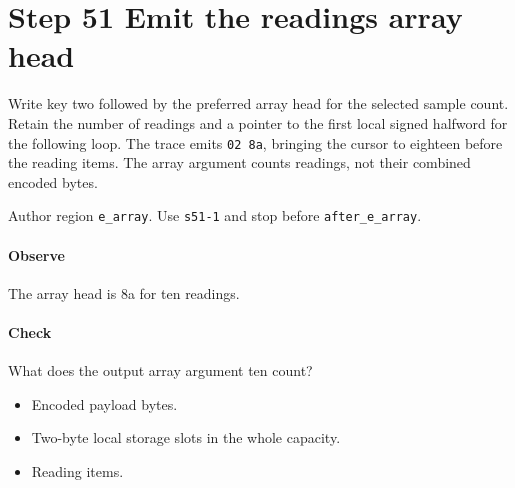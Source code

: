 \section{Step 51 Emit the readings array head}\label{cbor-s51}
Write key two followed by the preferred array head for the selected sample count. Retain the number of readings and a pointer to the first local signed halfword for the following loop. The trace emits \texttt{02 8a}, bringing the cursor to eighteen before the reading items. The array argument counts readings, not their combined encoded bytes.

Author region \texttt{e\_array}. Use \texttt{s51-1} and stop before \texttt{after\_e\_array}. 

\paragraph{Observe} The array head is 8a for ten readings.

\paragraph{Check} What does the output array argument ten count?
\begin{itemize}
\item[A.] Encoded payload bytes.
\item[B.] Two-byte local storage slots in the whole capacity.
\item[C.] Reading items.
\end{itemize}
